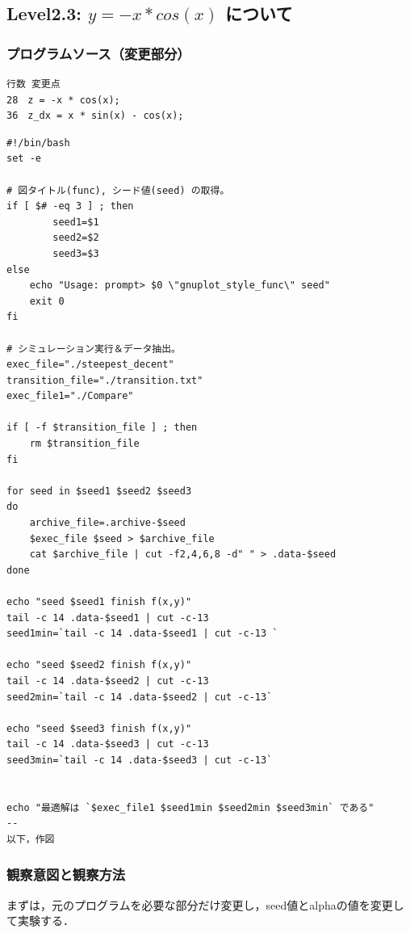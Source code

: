 \subsection{Level2.3: $y=-x*cos(x)$ について}
\subsubsection{プログラムソース（変更部分）}
\begin{breakbox}
\begin{verbatim}
行数 変更点
28　z = -x * cos(x);
36　z_dx = x * sin(x) - cos(x);
\end{verbatim}
\end{breakbox}

\begin{breakbox}
\begin{verbatim}
#!/bin/bash
set -e

# 図タイトル(func), シード値(seed) の取得。
if [ $# -eq 3 ] ; then
		seed1=$1
		seed2=$2
		seed3=$3
else
    echo "Usage: prompt> $0 \"gnuplot_style_func\" seed"
    exit 0
fi

# シミュレーション実行＆データ抽出。
exec_file="./steepest_decent"
transition_file="./transition.txt"
exec_file1="./Compare"

if [ -f $transition_file ] ; then
    rm $transition_file
fi

for seed in $seed1 $seed2 $seed3
do
	archive_file=.archive-$seed
	$exec_file $seed > $archive_file
	cat $archive_file | cut -f2,4,6,8 -d" " > .data-$seed
done

echo "seed $seed1 finish f(x,y)" 
tail -c 14 .data-$seed1 | cut -c-13
seed1min=`tail -c 14 .data-$seed1 | cut -c-13 `

echo "seed $seed2 finish f(x,y)" 
tail -c 14 .data-$seed2 | cut -c-13
seed2min=`tail -c 14 .data-$seed2 | cut -c-13`

echo "seed $seed3 finish f(x,y)" 
tail -c 14 .data-$seed3 | cut -c-13
seed3min=`tail -c 14 .data-$seed3 | cut -c-13`


echo "最適解は `$exec_file1 $seed1min $seed2min $seed3min` である"
--
以下，作図
\end{verbatim}
\end{breakbox}


\subsubsection{観察意図と観察方法}
まずは，元のプログラムを必要な部分だけ変更し，seed値とalphaの値を変更して実験する．

